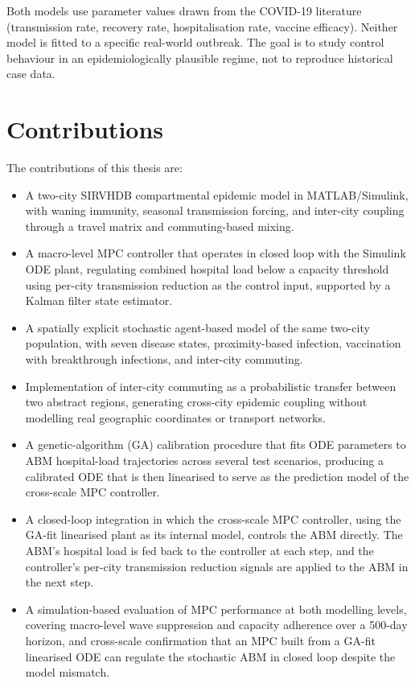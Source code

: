 Both models use parameter values drawn from the COVID-19 literature (transmission rate, recovery rate, hospitalisation rate, vaccine efficacy).
Neither model is fitted to a specific real-world outbreak.
The goal is to study control behaviour in an epidemiologically plausible regime, not to reproduce historical case data.

\section{Contributions}
\label{sec:contributions}

The contributions of this thesis are:
\begin{itemize}
  \item A two-city SIRVHDB compartmental epidemic model in MATLAB/Simulink, with waning immunity, seasonal transmission forcing, and inter-city coupling through a travel matrix and commuting-based mixing.
  \item A macro-level MPC controller that operates in closed loop with the Simulink ODE plant, regulating combined hospital load below a capacity threshold using per-city transmission reduction as the control input, supported by a Kalman filter state estimator.
  \item A spatially explicit stochastic agent-based model of the same two-city population, with seven disease states, proximity-based infection, vaccination with breakthrough infections, and inter-city commuting.
  \item Implementation of inter-city commuting as a probabilistic transfer between two abstract regions, generating cross-city epidemic coupling without modelling real geographic coordinates or transport networks.
  \item A genetic-algorithm (GA) calibration procedure that fits ODE parameters to ABM hospital-load trajectories across several test scenarios, producing a calibrated ODE that is then linearised to serve as the prediction model of the cross-scale MPC controller.
  \item A closed-loop integration in which the cross-scale MPC controller, using the GA-fit linearised plant as its internal model, controls the ABM directly. The ABM's hospital load is fed back to the controller at each step, and the controller's per-city transmission reduction signals are applied to the ABM in the next step.
  \item A simulation-based evaluation of MPC performance at both modelling levels, covering macro-level wave suppression and capacity adherence over a 500-day horizon, and cross-scale confirmation that an MPC built from a GA-fit linearised ODE can regulate the stochastic ABM in closed loop despite the model mismatch.
\end{itemize}

